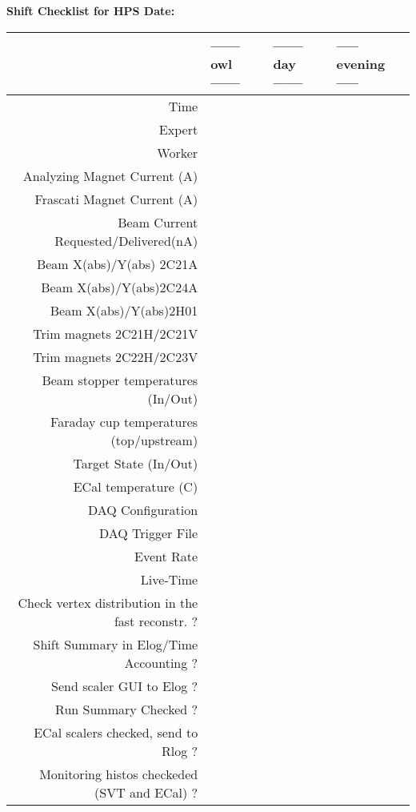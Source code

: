 \newpage

{\Large
{\bf{Shift Checklist for HPS \hskip 1.2in Date:}}
}

{\small
\hskip -1.25in
\begin{tabular}{|r||p{1.2in}|p{1.2in}|p{1.2in}|}

\hline 
& \multicolumn{1}{|p{1.2in}|}{------ owl ------}&
  \multicolumn{1}{|p{1.2in}|}{------ day ------}&
  \multicolumn{1}{|p{1.2in}|}{----- evening -----} \\ \hline 
\hline
Time  						&&& \\ \hline \hline
Expert						& & & \\ \hline \hline
Worker						&   & & \\ \hline  \hline
Analyzing Magnet Current (A)		& & & \\ \hline \hline 
Frascati Magnet Current (A)  		&&& \\ \hline \hline
Beam Current Requested/Delivered(nA)		& & & \\ \hline \hline 
Beam X(abs)/Y(abs) 2C21A			& & & \\ \hline \hline
Beam X(abs)/Y(abs)2C24A				& & & \\ \hline \hline
Beam X(abs)/Y(abs)2H01				& & & \\ \hline \hline
Trim magnets 2C21H/2C21V			& & & \\ \hline \hline
Trim magnets 2C22H/2C23V			& & & \\ \hline\hline
Beam stopper temperatures (In/Out) 	& & & \\ \hline \hline
Faraday cup temperatures (top/upstream) 	& & & \\ \hline \hline
Target State (In/Out)			& & & \\ \hline \hline
ECal temperature (C) 				& & & \\ \hline  \hline
DAQ Configuration  				& & & \\ \hline \hline
DAQ Trigger File   				& & & \\ \hline \hline
Event Rate					& &  & \\ \hline \hline
Live-Time					& &   & \\ \hline \hline 
Check vertex distribution in the fast reconstr. ?& & & \\ \hline  \hline
Shift Summary in Elog/Time Accounting ?		& & & \\ \hline \hline  
Send scaler GUI to Elog ?			& & & \\ \hline \hline  
Run Summary Checked ?				& & & \\ \hline \hline
ECal scalers checked, send to Rlog ?				& & & \\ \hline \hline
Monitoring histos checkeded (SVT and ECal) ?	& & & \\ \hline \hline
\end{tabular}
}


